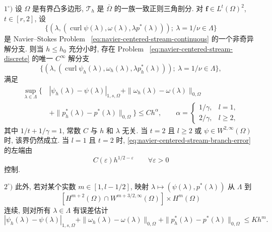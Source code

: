 \setcounter{statement}{3}
\begin{Theorem}\label{thm:navier-centered-stream-branch}
$1^\circ)$ 设 $\Omega$ 是有界凸多边形,
$\mathcal T_h$ 是 $\bar\Omega$ 的一族一致正则三角剖分. 对
$\boldsymbol f\in L^t(\Omega)^2$, $t\in[r,2]$, 设
\[
\{(\lambda,(\operatorname{curl}\psi(\lambda),\omega(\lambda),
\lambda p^*(\lambda)));
\ \lambda=1/\nu\in\Lambda\}
\]
是 Navier--Stokes Problem~
\eqref{eq:navier-centered-stream-continuous} 的一个非奇异解分支.
则当 $h\leq h_0$ 充分小时, 存在 Problem~
\eqref{eq:navier-centered-stream-discrete} 的唯一 $C^\infty$ 解分支
\[
\{(\lambda,(\operatorname{curl}\psi_h(\lambda),\omega_h(\lambda),
\lambda p_h^*(\lambda)));
\ \lambda=1/\nu\in\Lambda\},
\]
满足
\begin{equation}\label{eq:navier-centered-stream-branch-error}
\begin{aligned}
\sup_{\lambda\in\Lambda}
\{\,&|\psi_h(\lambda)-\psi(\lambda)|_{1,s,\Omega}
+\|\omega_h(\lambda)-\omega(\lambda)\|_{0,\Omega}\\
&+\|p_h^*(\lambda)-p^*(\lambda)\|_{0,\Omega}\}
\leq Ch^\alpha,
\qquad
\alpha=\begin{cases}
1/\gamma,&l=1,\\
2/\gamma,&l\geq2,
\end{cases}
\end{aligned}
\end{equation}
其中 $1/t+1/\gamma=1$, 常数 $C$ 与 $h$ 和 $\lambda$ 无关.
当 $t=2$ 且 $l\geq2$ 或 $\psi\in W^{2,\infty}(\Omega)$ 时,
该界仍然成立. 当 $l=1$ 且 $t=2$ 时,
\eqref{eq:navier-centered-stream-branch-error} 的左端由
\[
C(\varepsilon)h^{1/2-\varepsilon}
\qquad\forall\varepsilon>0
\]
控制.

$2^\circ)$ 此外, 若对某个实数 $m\in[1,l-1/2]$, 映射
$\lambda\mapsto(\psi(\lambda),p^*(\lambda))$ 从 $\Lambda$ 到
\[
[H^{m+2}(\Omega)\cap W^{m+3/2,\infty}(\Omega)]
\times H^m(\Omega)
\]
连续, 则对所有 $\lambda\in\Lambda$ 有误差估计
\begin{equation}\label{eq:navier-centered-stream-smooth-error}
|\psi_h(\lambda)-\psi(\lambda)|_{1,s,\Omega}
+\|\omega_h(\lambda)-\omega(\lambda)\|_{0,\Omega}
+\|p_h^*(\lambda)-p^*(\lambda)\|_{0,\Omega}
\leq Kh^m.
\end{equation}
\end{Theorem}


